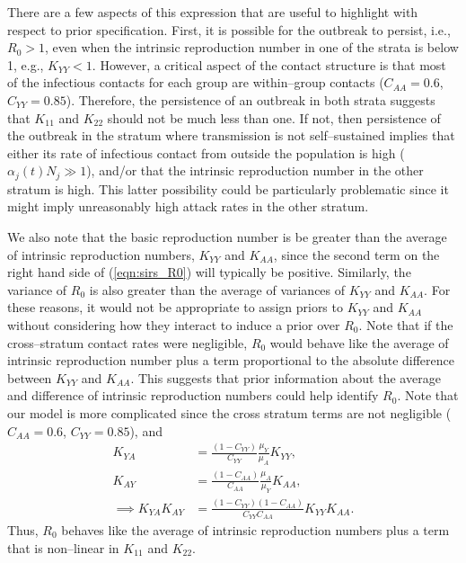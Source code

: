 There are a few aspects of this expression that are useful to highlight with respect to prior specification. First, it is possible for the outbreak to persist, i.e., $ R_0 > 1 $, even when the intrinsic reproduction number in one of the strata is below 1, e.g., $ K_{YY} <1$. However, a critical aspect of the contact structure is that most of the infectious contacts for each group are within--group contacts ($ C_{AA} = 0.6 $, $ C_{YY}=0.85 $). Therefore, the persistence of an outbreak in both strata suggests that $ K_{11} $ and $ K_{22} $ should not be much less than one. If not, then persistence of the outbreak in the stratum where transmission is not self--sustained implies that either its rate of infectious contact from outside the population is high ($ \alpha_j(t)N_j \gg  1$), and/or that the intrinsic reproduction number in the other stratum is high. This latter possibility could be particularly problematic since it might imply unreasonably high attack rates in the other stratum.

We also note that the basic reproduction number is be greater than the average of intrinsic reproduction numbers, $ K_{YY} $ and $ K_{AA} $, since the second term on the right hand side of (\ref{eqn:sirs_R0}) will typically be positive. Similarly, the variance of $ R_0 $ is also greater than the average of variances of $ K_{YY} $ and $ K_{AA} $. For these reasons, it would not be appropriate to assign priors to $ K_{YY} $ and $ K_{AA} $ without considering how they interact to induce a prior over $ R_0 $. Note that if the cross--stratum contact rates were negligible, $ R_0 $ would behave like the average of intrinsic reproduction number plus a term proportional to the absolute difference between $ K_{YY} $ and $ K_{AA} $. This suggests that prior information about the average and difference of intrinsic reproduction numbers could help identify $ R_0 $. Note that our model is more complicated since the cross stratum terms are not negligible ($ C_{AA} = 0.6 $, $ C_{YY}=0.85 $), and 
\begin{align*}
K_{YA} &= \frac{(1 - C_{YY})}{C_{YY}}\frac{\mu_Y}{\mu_A}K_{YY},\\
K_{AY} &= \frac{(1 - C_{AA})}{C_{AA}}\frac{\mu_A}{\mu_Y}K_{AA},\\
\implies K_{YA}K_{AY} &= \frac{(1 - C_{YY})(1-C_{AA})}{C_{YY}C_{AA}}K_{YY}K_{AA}.
\end{align*} 
Thus, $ R_0 $ behaves like the average of intrinsic reproduction numbers plus a term that is non--linear in $ K_{11} $ and $ K_{22} $.

